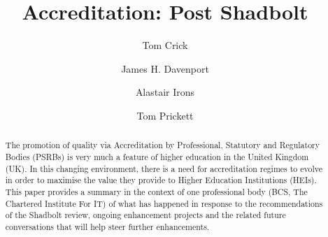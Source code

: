 \documentclass[sigconf]{acmart}
\begin{document}
\title{Accreditation: Post Shadbolt}




\author{Tom Crick}


\author{James H. Davenport}

\author{Alastair Irons}

\author{Tom Prickett}


\renewcommand{\shortauthors}{Crick, Davenport,  Irons, and Prickett.}

\begin{abstract}
The promotion of quality via Accreditation by Professional, Statutory and Regulatory Bodies (PSRBs) is very much a feature of higher education in the United Kingdom (UK).  In this changing  environment, there is a need for accreditation regimes to evolve in order to maximise the value they provide to Higher Education Institutions (HEIs).  This paper provides a summary in the context of one professional body (BCS, The Chartered Institute For IT) of
what has happened in response to the recommendations of the Shadbolt review,  ongoing enhancement projects and the related future conversations that will help steer further enhancements.
\end{abstract}
\end{document}
